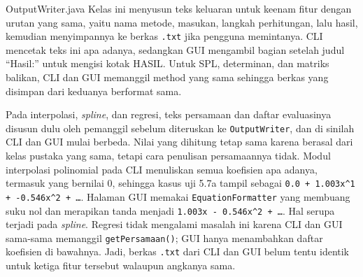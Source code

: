 \begin{kelas}{OutputWriter.java}
Kelas ini menyusun teks keluaran untuk keenam fitur dengan urutan yang sama, yaitu nama metode, masukan, langkah perhitungan, lalu hasil, kemudian menyimpannya ke berkas \texttt{.txt} jika pengguna memintanya. CLI mencetak teks ini apa adanya, sedangkan GUI mengambil bagian setelah judul ``Hasil:'' untuk mengisi kotak HASIL. Untuk SPL, determinan, dan matriks balikan, CLI dan GUI memanggil method yang sama sehingga berkas yang disimpan dari keduanya berformat sama.

Pada interpolasi, \textit{spline}, dan regresi, teks persamaan dan daftar evaluasinya disusun dulu oleh pemanggil sebelum diteruskan ke \texttt{OutputWriter}, dan di sinilah CLI dan GUI mulai berbeda. Nilai yang dihitung tetap sama karena berasal dari kelas pustaka yang sama, tetapi cara penulisan persamaannya tidak. Modul interpolasi polinomial pada CLI menuliskan semua koefisien apa adanya, termasuk yang bernilai 0, sehingga kasus uji 5.7a tampil sebagai \texttt{0.0 + 1.003x\^{}1 + -0.546x\^{}2 + \ldots}. Halaman GUI memakai \texttt{EquationFormatter} yang membuang suku nol dan merapikan tanda menjadi \texttt{1.003x - 0.546x\^{}2 + \ldots}. Hal serupa terjadi pada \textit{spline}. Regresi tidak mengalami masalah ini karena CLI dan GUI sama-sama memanggil \texttt{getPersamaan()}; GUI hanya menambahkan daftar koefisien di bawahnya. Jadi, berkas \texttt{.txt} dari CLI dan GUI belum tentu identik untuk ketiga fitur tersebut walaupun angkanya sama.
 
 
 
 
\end{kelas}

